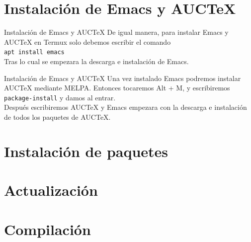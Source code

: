 \documentclass[12pt,aspectratio=43]{beamer}
\begin{document}
\section{Instalación de Emacs y AUCTeX}
\begin{frame}{Instalación de Emacs y AUC{\TeX}}{}
De igual manera, para instalar Emacs y AUC{\TeX} en Termux solo debemos escribir el comando\\[1em]

\texttt{apt install emacs}\pause\\[1em]

Tras lo cual se empezara la descarga e instalación de Emacs.
\end{frame}

\begin{frame}{Instalación de Emacs y AUC{\TeX}}
Una vez instalado Emacs podremos instalar AUC{\TeX} mediante MELPA. Entonces tocaremos Alt + M, y escribiremos \texttt{package-install} y damos al entrar.\pause\\[1em]

Después escribiremos AUC{\TeX} y Emacs empezara con la descarga e instalación de todos los paquetes de AUC{\TeX}.
\end{frame}

\section{Instalación de paquetes}

\section{Actualización}

\section{Compilación}
\end{document}
